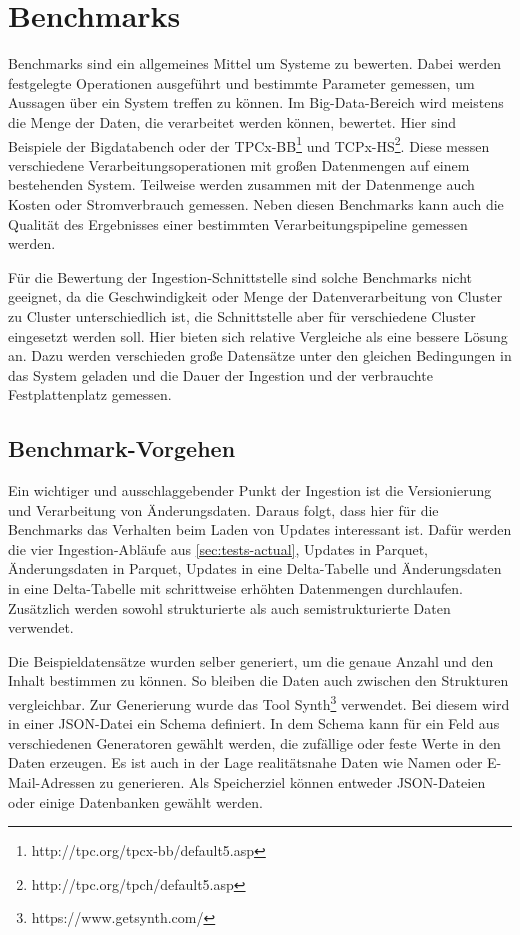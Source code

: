 \section{Benchmarks}

Benchmarks sind ein allgemeines Mittel um Systeme zu bewerten.
Dabei werden festgelegte Operationen ausgeführt und bestimmte Parameter gemessen, um Aussagen über ein System treffen zu können.
Im Big-Data-Bereich wird meistens die Menge der Daten, die verarbeitet werden können, bewertet.
Hier sind Beispiele der Bigdatabench \parencite{bigdatabench} oder der TPCx-BB\footnote{http://tpc.org/tpcx-bb/default5.asp} und TCPx-HS\footnote{http://tpc.org/tpch/default5.asp}.
Diese messen verschiedene Verarbeitungsoperationen mit großen Datenmengen auf einem bestehenden System.
Teilweise werden zusammen mit der Datenmenge auch Kosten oder Stromverbrauch gemessen.
Neben diesen Benchmarks kann auch die Qualität des Ergebnisses einer bestimmten Verarbeitungspipeline gemessen werden.

Für die Bewertung der Ingestion-Schnittstelle sind solche Benchmarks nicht geeignet, da die Geschwindigkeit oder Menge der Datenverarbeitung von Cluster zu Cluster unterschiedlich ist, die Schnittstelle aber für verschiedene Cluster eingesetzt werden soll.
Hier bieten sich relative Vergleiche als eine bessere Lösung an.
Dazu werden verschieden große Datensätze unter den gleichen Bedingungen in das System geladen und die Dauer der Ingestion und der verbrauchte Festplattenplatz gemessen.

\subsection{Benchmark-Vorgehen}
Ein wichtiger und ausschlaggebender Punkt der Ingestion ist die Versionierung und Verarbeitung von Änderungsdaten.
Daraus folgt, dass hier für die Benchmarks das Verhalten beim Laden von Updates interessant ist.
Dafür werden die vier Ingestion-Abläufe aus \cref{sec:tests-actual}, Updates in Parquet, Änderungsdaten in Parquet, Updates in eine Delta-Tabelle und Änderungsdaten in eine Delta-Tabelle mit schrittweise erhöhten Datenmengen durchlaufen.
Zusätzlich werden sowohl strukturierte als auch semistrukturierte Daten verwendet.

Die Beispieldatensätze wurden selber generiert, um die genaue Anzahl und den Inhalt bestimmen zu können.
So bleiben die Daten auch zwischen den Strukturen vergleichbar.
Zur Generierung wurde das Tool Synth\footnote{https://www.getsynth.com/} verwendet.
Bei diesem wird in einer JSON-Datei ein Schema definiert.
In dem Schema kann für ein Feld aus verschiedenen Generatoren gewählt werden, die zufällige oder feste Werte in den Daten erzeugen.
Es ist auch in der Lage realitätsnahe Daten wie Namen oder E-Mail-Adressen zu generieren.
Als Speicherziel können entweder JSON-Dateien oder einige Datenbanken gewählt werden.

